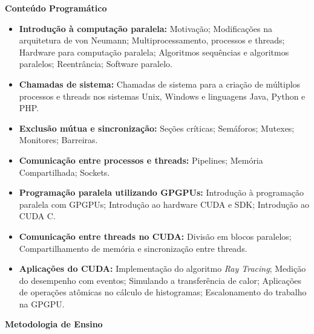 
\begin{snugshade}\begin{center}\textbf{
    Conteúdo Programático
}\end{center}\end{snugshade}

\begin{itemize}

 \item \textbf{Introdução à computação paralela:} Motivação; Modificações na arquitetura de von Neumann; Multiprocessamento, processos e threads; Hardware para computação paralela; Algoritmos sequências e algoritmos paralelos; Reentrância; Software paralelo.
 
 \item \textbf{Chamadas de sistema:} Chamadas de sistema para a criação de múltiplos processos e threads nos sistemas Unix, Windows e linguagens Java, Python e PHP.
 
 \item \textbf{Exclusão mútua e sincronização:} Seções críticas; Semáforos; Mutexes; Monitores; Barreiras.
 
 \item \textbf{Comunicação entre processos e threads:} Pipelines; Memória Compartilhada; Sockets.
 
 \item \textbf{Programação paralela utilizando GPGPUs:} Introdução à programação paralela com GPGPUs; Introdução ao hardware CUDA e SDK; Introdução ao CUDA C.
 
 \item \textbf{Comunicação entre threads no CUDA:} Divisão em blocos paralelos; Compartilhamento de memória e sincronização entre threads.
 
 \item \textbf{Aplicações do CUDA:} Implementação do algoritmo \textit{Ray Tracing}; Medição do desempenho com eventos; Simulando a transferência de calor; Aplicações de operações atômicas no cálculo de histogramas; Escalonamento do trabalho na GPGPU.
 
\end{itemize}

\begin{snugshade}\begin{center}\textbf{
    Metodologia de Ensino
}\end{center}\end{snugshade}


